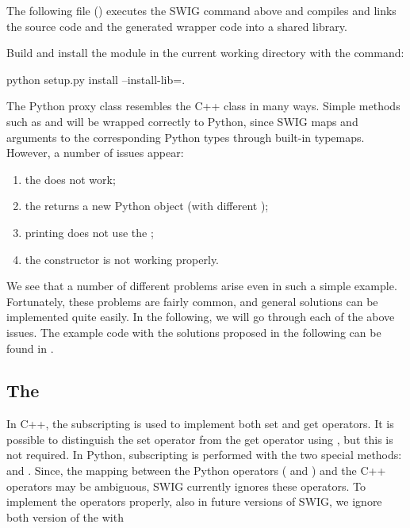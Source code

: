 The following \citet{www:distutils} file ()
executes the SWIG command above and compiles and links the
source code and the generated wrapper code into a shared library.\vspace*{3pt}



\vspace*{5pt}

\noindent Build and install the
module in the current working directory with the command:\vspace*{3pt}
\begin{bash}
python setup.py install --install-lib=.
\end{bash}

\vspace*{5pt}

\noindent The Python proxy class resembles the C++ class in many ways. Simple
methods such as  and  will be wrapped correctly
to Python, since SWIG maps  and  arguments to the
corresponding Python types through built-in typemaps.  However, a number
of issues appear:
\begin{enumerate}
\item the  does not work;

\item the  returns a new Python object (with different
);

\item printing does not use the ;

\item the  constructor is not working
properly.
\end{enumerate}
We see that a number of different problems arise even in such a simple
example. Fortunately, these problems are fairly common, and general
solutions can be implemented quite easily. In the following, we will go
through each of the above issues. The example code with the solutions
proposed in the following can be found in .

\vspace*{3pt}
\subsection{The }

In C++, the subscripting  is used to implement
both set and get operators. It is possible to distinguish the set
operator from the get operator using , but this is not
required.  In Python, subscripting is performed with the two special
methods:  and .  Since,
the mapping between the Python operators ( and
) and the C++ operators  may be
ambiguous, SWIG currently ignores these operators.  To implement the
operators properly, also in future versions of SWIG, we ignore both
version of the  with\vspace*{3pt}
\begin{swigcode}
\end{swigcode}

